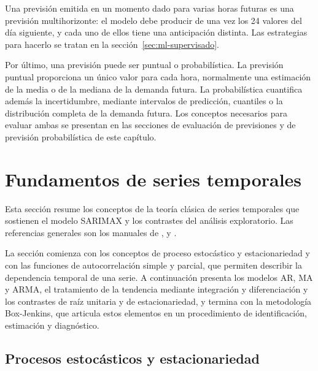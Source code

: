 Una previsión emitida en un momento dado para varias horas futuras es una
previsión multihorizonte: el modelo debe producir de una vez los 24 valores
del día siguiente, y cada uno de ellos tiene una anticipación distinta. Las
estrategias para hacerlo se tratan en la
sección~\ref{sec:ml-supervisado}.

Por último, una previsión puede ser puntual o probabilística. La previsión
puntual proporciona un único valor para cada hora, normalmente una
estimación de la media o de la mediana de la demanda futura. La
probabilística cuantifica además la incertidumbre, mediante intervalos de
predicción, cuantiles o la distribución completa de la demanda futura. Los
conceptos necesarios para evaluar ambas se presentan en las secciones de
evaluación de previsiones y de previsión probabilística de este capítulo.

\section{Fundamentos de series temporales}\label{sec:fundamentos}

Esta sección resume los conceptos de la teoría clásica de series temporales
que sostienen el modelo SARIMAX y los contrastes del análisis exploratorio.
Las referencias generales son los manuales de \textcite{box2015time},
\textcite{shumway2017time} y \textcite{hyndman2021fpp3}.

La sección comienza con los conceptos de proceso estocástico y
estacionariedad y con las funciones de autocorrelación simple y parcial, que
permiten describir la dependencia temporal de una serie. A continuación
presenta los modelos AR, MA y ARMA, el tratamiento de la tendencia mediante
integración y diferenciación y los contrastes de raíz unitaria y de
estacionariedad, y termina con la metodología Box-Jenkins, que articula estos
elementos en un procedimiento de identificación, estimación y diagnóstico.

\subsection{Procesos estocásticos y estacionariedad}\label{sec:estacionariedad}

